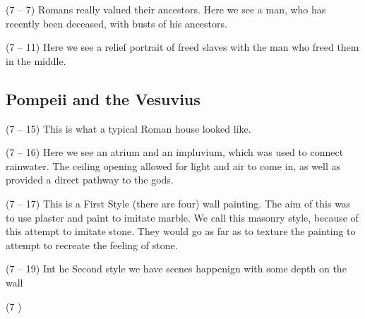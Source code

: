 \documentclass{article}
\begin{document}
\begin{spacing}{1.2}
        (7 -- 7) Romans really valued their ancestors. Here we see a man, who has recently been deceased, with busts of his ancestors. 

        (7 -- 11) Here we see a relief portrait of freed slaves with the man who freed them in the middle. 
        
        \subsection{Pompeii and the Vesuvius}

        (7 -- 15) This is what a typical Roman house looked like. 
        
        (7 -- 16) Here we see an atrium and  an impluvium, which was used to connect rainwater. The ceiling opening allowed for light and air to come in, as well as provided a direct pathway to the gods. 

        (7 -- 17) This is a First Style (there are four) wall painting. The aim of this was to use plaster and paint to imitate marble. We call this masonry style, because of this attempt to imitate stone. They would go as far as to texture the painting to attempt to recreate the feeling of stone.

        (7 -- 19) Int he Second style we have scenes happenign with some depth on the wall

        (7 )


    \end{spacing}
\end{document}
